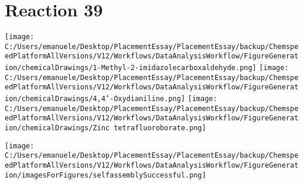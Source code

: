\documentclass{article}%
\begin{document}
\section*{Reaction 39}%
%
\begin{scheme}[H]%
\begin{minipage}{0.5\textwidth}%
\texttt{[image: C:/Users/emanuele/Desktop/PlacementEssay/PlacementEssay/backup/ChemspeedPlatformAllVersions/V12/Workflows/DataAnalysisWorkflow/FigureGeneration/chemicalDrawings/1-Methyl-2-imidazolecarboxaldehyde.png]}%
\texttt{[image: C:/Users/emanuele/Desktop/PlacementEssay/PlacementEssay/backup/ChemspeedPlatformAllVersions/V12/Workflows/DataAnalysisWorkflow/FigureGeneration/chemicalDrawings/4,4'-Oxydianiline.png]}%
\texttt{[image: C:/Users/emanuele/Desktop/PlacementEssay/PlacementEssay/backup/ChemspeedPlatformAllVersions/V12/Workflows/DataAnalysisWorkflow/FigureGeneration/chemicalDrawings/Zinc tetrafluoroborate.png]}%
\end{minipage}%
\begin{minipage}{0.5\textwidth}%
\begin{center}%
\texttt{[image: C:/Users/emanuele/Desktop/PlacementEssay/PlacementEssay/backup/ChemspeedPlatformAllVersions/V12/Workflows/DataAnalysisWorkflow/FigureGeneration/imagesForFigures/selfassemblySuccessful.png]}%
\end{center}%
\end{minipage}%
\caption{Self-assembly of components 12, 15, with Zinc(II) in a 3.0:1.5:1.0 molar ratio in CH$_3$CN at 60\textdegree C for 40h. These are the reagents (starting materials) for reaction 39.}%
\end{scheme}%
\end{document}
